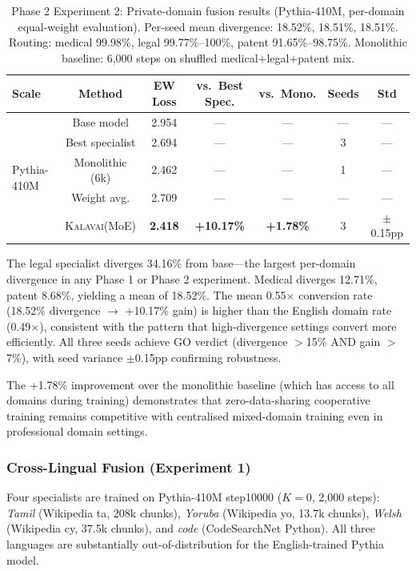 \documentclass{article}
\newcommand{\kalavai}{\textsc{Kalavai}\xspace}
\begin{document}
\begin{table}[h]
\centering
\caption{Phase 2 Experiment 2: Private-domain fusion results (Pythia-410M, per-domain equal-weight evaluation). Per-seed mean divergence: 18.52\%, 18.51\%, 18.51\%. Routing: medical 99.98\%, legal 99.77\%--100\%, patent 91.65\%--98.75\%. Monolithic baseline: 6,000 steps on shuffled medical+legal+patent mix.}
\label{tab:phase2_private}
\small
\begin{tabular}{lcccccc}
\toprule
\textbf{Scale} & \textbf{Method} & \textbf{EW Loss} & \textbf{vs.\ Best Spec.} & \textbf{vs.\ Mono.} & \textbf{Seeds} & \textbf{Std} \\
\midrule
\multirow{5}{*}{Pythia-410M}
 & Base model       & 2.954 & ---     & ---     & ---  & ---   \\
 & Best specialist  & 2.694 & ---     & ---     & 3    & ---   \\
 & Monolithic (6k)  & 2.462 & ---     & ---     & 1    & ---   \\
 & Weight avg.      & 2.709 & ---     & ---     & ---  & ---   \\
 & \kalavai (MoE)   & \textbf{2.418} & \textbf{+10.17\%} & \textbf{+1.78\%} & 3 & $\pm$0.15pp \\
\bottomrule
\end{tabular}
\end{table}

The legal specialist diverges 34.16\% from base---the largest per-domain divergence in any Phase 1 or Phase 2 experiment. Medical diverges 12.71\%, patent 8.68\%, yielding a mean of 18.52\%. The mean 0.55$\times$ conversion rate (18.52\% divergence $\to$ +10.17\% gain) is higher than the English domain rate (0.49$\times$), consistent with the pattern that high-divergence settings convert more efficiently. All three seeds achieve GO verdict (divergence $>$15\% AND gain $>$7\%), with seed variance $\pm$0.15pp confirming robustness.

The +1.78\% improvement over the monolithic baseline (which has access to all domains during training) demonstrates that zero-data-sharing cooperative training remains competitive with centralised mixed-domain training even in professional domain settings.

\subsubsection{Cross-Lingual Fusion (Experiment 1)}
\label{sec:phase2_crosslingual}

Four specialists are trained on Pythia-410M step10000 ($K=0$, 2,000 steps): \emph{Tamil} (Wikipedia ta, 208k chunks), \emph{Yoruba} (Wikipedia yo, 13.7k chunks), \emph{Welsh} (Wikipedia cy, 37.5k chunks), and \emph{code} (CodeSearchNet Python). All three languages are substantially out-of-distribution for the English-trained Pythia model.
\end{document}
